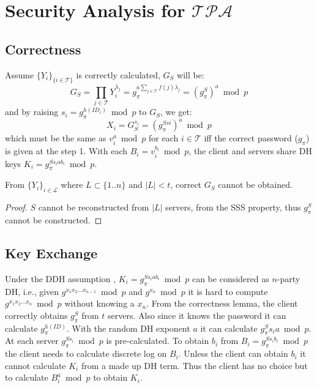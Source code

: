 \section{Security Analysis for $\mathcal{TPA}$}
\label{tpa}
\subsection{Correctness}
Assume $\{Y_i\}_{\{i \in \mathcal{T}\}}$ is correctly calculated,
$G_S$ will be:
\[
  G_S = \prod_{j \in \mathcal{T}}Y_i^{\lambda_j} = g_{\pi}^{a \sum_{j
      \in \mathcal{T}} f(j) \lambda_j} = (g_{\pi}^S)^a \bmod p
\]
and by raising $s_i = g_{\pi}^{h(ID_i)} \bmod p$ to $G_S$, we get:
\[
  X_i = G_S^{s_i} = (g_{\pi}^{Ssi})^a \bmod p
\]
which must be the same as $v_i^a \bmod p$ for each $i \in
\mathcal{T}$ iff the correct password ($g_{\pi}$) is given at the
step 1. With each $B_i = v_i^{b_i} \bmod p$, the client and servers
share DH keys $K_i = g_{\pi}^{Ss_iab_i} \bmod p$.

\begin{lemma}
\label{tpa1}
From $\{Y_i\}_{i \in \mathcal{L}}$ where $L \subset \{1..n\}$ and $|L| <
t$, correct $G_S$ cannot be obtained.
\end{lemma}

\begin{proof}
$S$ cannot be reconstructed from $|L|$ servers, from the SSS
  property, thus $g_{\pi}^S$ cannot be constructed.
\end{proof}

\subsection{Key Exchange}
Under the DDH assumption \cite{boneh}, $K_i = g_{\pi}^{Ss_iab_i} \bmod
p$ can be considered as $n$-party DH, i.e., given
$g^{x_1x_2...x_{n-1}} \bmod p$ and $g^{x_n} \bmod p$ it is hard to
compute $g^{x_1x_2...x_n} \bmod p$ without knowing a $x_n$.
From the correctness lemma, the client correctly obtains
$g_{\pi}^S$ from $t$ servers. Also since it knows the password it can
calculate $g_{\pi}^{h(ID)}$. With the random DH exponent $a$ it can
calculate $g_{\pi}^Ss_ia \bmod p$. At each server $g_{\pi}^{Ss_i}
\bmod p$ is pre-calculated. To obtain $b_i$ from $B_i =
g_{\pi}^{Ss_ib_i} \bmod p$ the client needs to calculate discrete log
on $B_i$. Unless the client can obtain $b_i$ it cannot calculate $K_i$
from a made up DH term. Thus the client has no choice but to calculate
$B_i^a \bmod p$ to obtain $K_i$.

